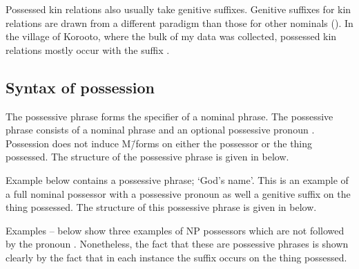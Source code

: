 Possessed kin relations also usually take genitive suffixes.
Genitive suffixes for kin relations are drawn from a different
paradigm than those for other nominals ().
In the village of Koro{\Q}oto, where the bulk of my data was collected,
possessed kin relations mostly occur with the suffix .

\subsection{Syntax of possession}\label{sec:SynPoss}
The possessive phrase forms the specifier of a nominal phrase.
The possessive phrase consists of a nominal phrase and an optional possessive pronoun .
Possession does not induce M\=/forms on either the possessor or the thing possessed.
The structure of the possessive phrase is given in  below.

\begin{exe}
	\label{tr:PossP}
\end{exe}

Example  below contains a possessive phrase;
 `God's name'.
This is an example of a full nominal possessor
with a possessive pronoun as well a genitive suffix on the thing possessed.
The structure of this possessive phrase is given in  below.

\begin{exe}
	\label{ex:130902-1, 1.34}
		\label{tr:130902-1, 1.34}
	\end{exe}

Examples --
below show three examples of NP possessors which are not followed by the pronoun .
Nonetheless, the fact that these are possessive phrases is shown clearly by the fact
that in each instance the  suffix  occurs on the thing possessed.

